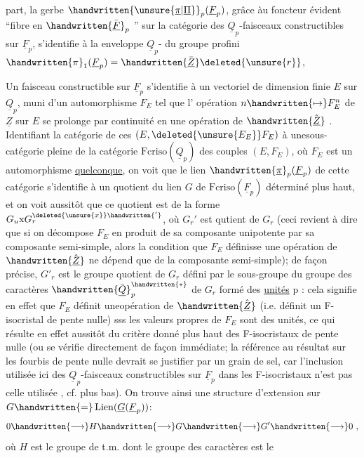 
part,  la gerbe $\handwritten{\unsure{\underline{\pi}|\underline{\Pi}}}_p(\underline{F}_p)$, grâce àu foncteur  évident ``fibre en $\handwritten{\bar{\underline{F}}}_p$ '' sur la catégorie des $\underline{Q}_p$-faisceaux constructibles sur $\underline{F}_p$, s'identifie à la enveloppe $\underline{Q}_p$- du groupe profini $\handwritten{\pi}_1(\underline{F}_p)=\handwritten{\bar{\underline{Z}}}\deleted{\unsure{r}}$, 

Un faisceau constructible sur $\underline{F}_p$ s'identifie à un vectoriel de dimension finie $E$ sur $\underline{Q}_p$, muni d'un automorphisme $F_E$ tel que l' opération $n\handwritten{\mapsto}F_E^n$ de $\underline{Z}$ sur $E$ se prolonge par continuité en une opération de  $\handwritten{\hat{\underline{Z}}}$ . Identifiant  la catégorie de ces $(E,\deleted{\unsure{E_E}}F_E)$ à une\handwritten{\,}sous-catégorie pleine de la catégorie  $\mathrm{Fcriso}(\underline{Q}_p)$ des couples $(E,F_E)$, où $F_E$ est un automorphisme \uline{quelconque}, on voit que le lien  $\handwritten{\underline{\pi}}_p(\underline{F}_p)$ de cette catégorie s'identifie à un quotient du lien $G$ de $\mathrm{Fcriso}(\underline{F}_p)$ déterminé plus haut, et on voit aussitôt que ce quotient est de la forme $G_u\mathrm{x}G_r^{\deleted{\unsure{x}}\handwritten{'}}$, où $G_r'$ est  qutient de $G_r$ (ceci revient à dire que si on décompose $F_E$ en produit de sa composante unipotente par sa composante semi-simple, alors la condition que $F_E$ définisse une opération de $\handwritten{\hat{\underline{Z}}}$ ne dépend que de la composante semi-simple); de façon précise, $G'_r$ est le groupe quotient de $G_r$ défini par le sous-groupe du groupe des caractères $\handwritten{\bar{\underline{Q}}}_p^{\handwritten{*}}$ de $G_r$ formé des \uline{unités} p\uline{} : cela signifie en effet que $F_E$ définit uneopération de  $\handwritten{\hat{\underline{Z}}}$ (i.e. définit un F-isocristal de pente nulle) sss les valeurs propres de $F_E$ sont des unités, ce qui résulte en effet aussitôt du critère donné plus haut des F-isocristaux de pente nulle (ou se vérifie directement de façon immédiate; la référence au résultat sur les fourbis de pente nulle devrait se justifier par un grain de sel, car l'inclusion utilisée ici des $\underline{Q}_p$-faisceaux constructibles sur $\underline{F}_p$ dans les F-isocristaux n'est pas celle utilisée , cf. plus bas). On trouve ainsi une structure d'extension sur $G\handwritten{=}\operatorname{Lien}(\underline{G}(\underline{F}_p))$:
\[
0\handwritten{\longrightarrow}H\handwritten{\longrightarrow}G\handwritten{\longrightarrow}G'\handwritten{\longrightarrow}0\ ,
\]
où $H$ est le groupe de t.m. dont le groupe des caractères est le

